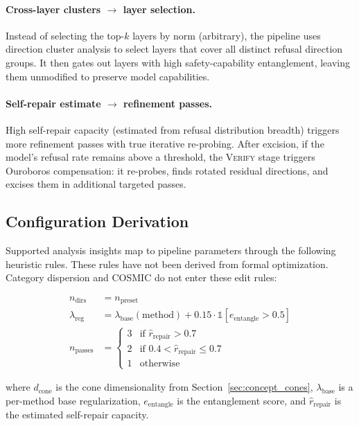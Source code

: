 \documentclass[11pt]{article}
\begin{document}
\paragraph{Cross-layer clusters $\to$ layer selection.}
Instead of selecting the top-$k$ layers by norm (arbitrary), the pipeline uses direction cluster analysis to select layers that cover all distinct refusal direction groups.
It then gates out layers with high safety-capability entanglement, leaving them unmodified to preserve model capabilities.

\paragraph{Self-repair estimate $\to$ refinement passes.}
High self-repair capacity (estimated from refusal distribution breadth) triggers more refinement passes with true iterative re-probing.
After excision, if the model's refusal rate remains above a threshold, the \textsc{Verify} stage triggers Ouroboros compensation: it re-probes, finds rotated residual directions, and excises them in additional targeted passes.

\subsection{Configuration Derivation}

Supported analysis insights map to pipeline parameters through the following heuristic rules. These rules have not been derived from formal optimization. Category dispersion and COSMIC do not enter these edit rules:

\begin{align}
    n_{\text{dirs}} &= n_{\text{preset}} \\
    \lambda_{\text{reg}} &= \lambda_{\text{base}}(\text{method}) + 0.15 \cdot \mathbb{1}[e_{\text{entangle}} > 0.5] \\
    n_{\text{passes}} &= \begin{cases}
        3 & \text{if } \hat{r}_{\text{repair}} > 0.7 \\
        2 & \text{if } 0.4 < \hat{r}_{\text{repair}} \leq 0.7 \\
        1 & \text{otherwise}
    \end{cases}
\end{align}

where $d_{\text{cone}}$ is the cone dimensionality from Section~\ref{sec:concept_cones}, $\lambda_{\text{base}}$ is a per-method base regularization, $e_{\text{entangle}}$ is the entanglement score, and $\hat{r}_{\text{repair}}$ is the estimated self-repair capacity.
\end{document}
